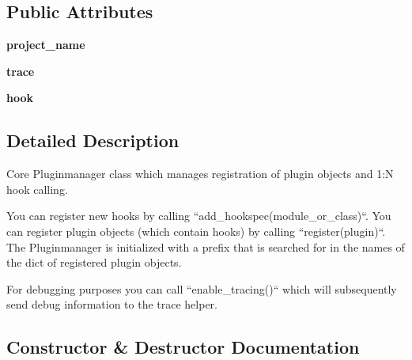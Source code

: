 \subsection*{Public Attributes}
\begin{DoxyCompactItemize}
\item 
\mbox{\label{classpluggy_1_1manager_1_1_plugin_manager_ab0f1422d921531d1369c6302244b568e}} 
{\bfseries project\+\_\+name}
\item 
\mbox{\label{classpluggy_1_1manager_1_1_plugin_manager_a47e064f24c90d3e5e7e6d700ebe09872}} 
{\bfseries trace}
\item 
\mbox{\label{classpluggy_1_1manager_1_1_plugin_manager_a46054d9c26595c7e77d5a8dd96c4b9dd}} 
{\bfseries hook}
\end{DoxyCompactItemize}


\subsection{Detailed Description}
\begin{DoxyVerb}Core Pluginmanager class which manages registration
of plugin objects and 1:N hook calling.

You can register new hooks by calling ``add_hookspec(module_or_class)``.
You can register plugin objects (which contain hooks) by calling
``register(plugin)``.  The Pluginmanager is initialized with a
prefix that is searched for in the names of the dict of registered
plugin objects.

For debugging purposes you can call ``enable_tracing()``
which will subsequently send debug information to the trace helper.
\end{DoxyVerb}
 

\subsection{Constructor \& Destructor Documentation}
\mbox{\label{classpluggy_1_1manager_1_1_plugin_manager_a43a417b7a5cdde67b91e5a08666f5ce0}} 
